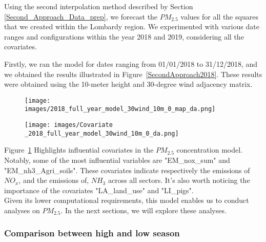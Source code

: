 \documentclass[11pt,a4paper]{article}
\begin{document}
Using the second interpolation method described by Section \ref{Second_Approach_Data_prep}, we forecast the $PM_{2.5}$ values for all the squares that we created within the Lombardy region. We experimented with various date ranges and configurations within the year 2018 and 2019, considering all the covariates.

Firstly, we ran the model for dates ranging from 01/01/2018 to 31/12/2018, and we obtained the results illustrated in Figure~\ref{SecondApproach2018}. These results were obtained using the 10-meter height and 30-degree wind adjacency matrix.

\begin{figure} [H]
    \begin{minipage}{0.5\textwidth}
        \centering
        \texttt{[image: images/2018\_full\_year\_model\_30wind\_10m\_0\_map\_da.png]}
        \vspace{1.7cm}
        \label{SecondApproach2018}
    \end{minipage}%
    \begin{minipage}{0.5\textwidth}
        \centering
        \texttt{[image: images/Covariate \_2018\_full\_year\_model\_30wind\_10m\_0\_da.png]}
        \captionsetup{format=hang}
        \label{Covariate_Second_Approach2018}
    \end{minipage}
\end{figure}

Figure~\ref{Covariate_Second_Approach2018} Highlights influential covariates in the $PM_{\text{2.5}}$ concentration model. Notably, some of the most influential variables are "EM\_nox\_sum" and "EM\_nh3\_Agri\_soils". These covariates indicate respectively the emissions of $NO_{x}$, and the emissions of, $NH_{3}$ across all sectors. It's also worth noticing the importance of the covariates "LA\_land\_use" and "LI\_pigs". \\

Given its lower computational requirements, this model enables us to conduct analyses on $PM_{\text{2.5}}$. In the next sections, we will explore these analyses.

\subsubsection{Comparison between high and low season}
\label{comp_HL}
\end{document}
